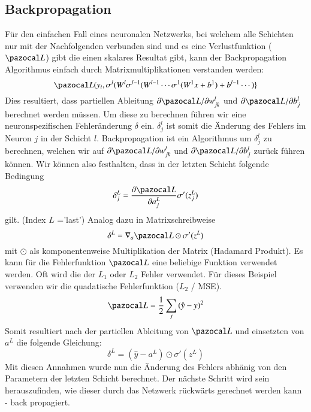 \subsection{Backpropagation}
Für den einfachen Fall eines neuronalen Netzwerks, bei welchem alle Schichten nur mit der Nachfolgenden verbunden sind und es eine Verlustfunktion ($\Lb$) gibt die einen skalares Resultat gibt, kann der Backpropagation Algorithmus einfach durch Matrixmultiplikationen verstanden werden:
\begin{equation}
\Lb(y_{i}, \sigma^{l}(W^{l}\sigma^{l-1}(W^{l-1}\cdots \sigma^{1}(W^{1}x+b^{1}) + b^{l-1} \cdots ) \}
\end{equation}
Dies resultiert, dass partiellen Ableitung $\partial \Lb / \partial w^l_{jk}$ und $\partial \Lb / \partial b^l_j$ berechnet werden müssen. Um diese zu berechnen führen wir eine neuronspezifischen Fehleränderung $\delta$ ein. $\delta^{l}_{j}$ ist somit die Änderung des Fehlers im Neuron $j$ in der Schicht $l$. Backpropagation ist ein Algorithmus um $\delta^{l}_{j}$ zu berechnen, welchen wir auf $\partial \Lb / \partial w^l_{jk}$ und $\partial \Lb / \partial b^l_j$ zurück führen können. Wir können also festhalten, dass in der letzten Schicht folgende Bedingung
\begin{equation}
\delta^{L}_{j} = \frac{\partial \Lb}{\partial a^{L}_{j}} \sigma'(z^L_j)
\end{equation}
gilt. (Index $L$ ='last') Analog dazu in Matrixschreibweise
\begin{equation}
\delta^{L} = \nabla_a \Lb \odot \sigma'(z^L)
\end{equation}
mit $\odot$ als komponentenweise Multiplikation der Matrix (Hadamard Produkt). Es kann für die Fehlerfunktion $\Lb$ eine beliebige Funktion verwendet werden. Oft wird die der $L_1$ oder $L_2$ Fehler verwendet. Für dieses Beispiel verwenden wir die quadatische Fehlerfunktion ($L_2$ / MSE).
\begin{equation}
\Lb = \frac{1}{2} \sum_j \left( \hat{y} - y \right)^2
\end{equation}
Somit resultiert nach der partiellen Ableitung von $\Lb$ und einsetzten von $a^L$ die folgende Gleichung:
\begin{equation}
\delta^{L} = (\hat{y} - a^L) \odot \sigma'(z^L)
\end{equation}
Mit diesen Annahmen wurde nun die Änderung des Fehlers abhänig von den Parametern der letzten Schicht berechnet. Der nächste Schritt wird sein herauszufinden, wie dieser durch das Netzwerk rückwärts gerechnet werden kann - back propagiert.
